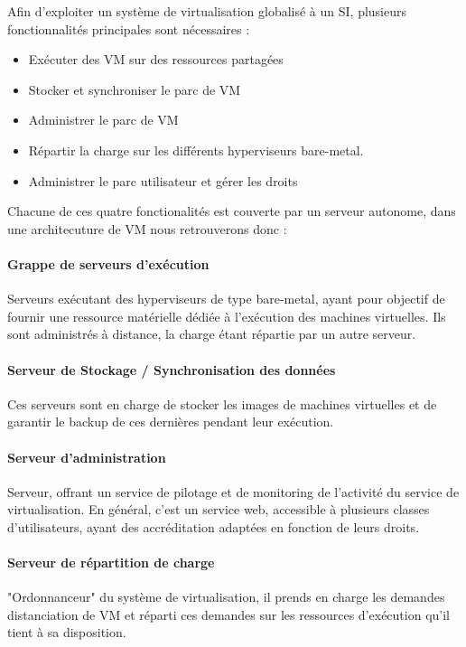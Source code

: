 Afin d'exploiter un système de virtualisation globalisé à un SI, plusieurs fonctionnalités principales sont nécessaires :\\
\begin{itemize}
\item Exécuter des VM sur des ressources partagées
\item Stocker et synchroniser le parc de VM
\item Administrer le parc de VM
\item Répartir la charge sur les différents hyperviseurs bare-metal.
\item Administrer le parc utilisateur et gérer les droits\\
\end{itemize} 

Chacune de ces quatre fonctionalités est couverte par un serveur autonome, dans une architecuture de VM nous retrouverons donc :\\

\paragraph{Grappe de serveurs d'exécution} Serveurs exécutant des hyperviseurs de type bare-metal,  ayant pour objectif de fournir une ressource matérielle dédiée à l'exécution des machines virtuelles. Ils sont administrés à distance, la charge étant répartie par un autre serveur. 

\paragraph{Serveur de Stockage / Synchronisation des données} Ces serveurs sont en charge de stocker les images de machines virtuelles et de garantir le backup de ces dernières pendant leur exécution.

\paragraph{Serveur d'administration} Serveur, offrant un service de pilotage et de monitoring de l'activité du service de virtualisation. En général, c'est un service web, accessible à plusieurs classes d'utilisateurs, ayant des accréditation adaptées en fonction de leurs droits.

\paragraph{Serveur de répartition de charge}
"Ordonnanceur" du système de virtualisation, il prends en charge les demandes distanciation de VM et réparti ces demandes sur les ressources d'exécution qu'il tient à sa disposition.

